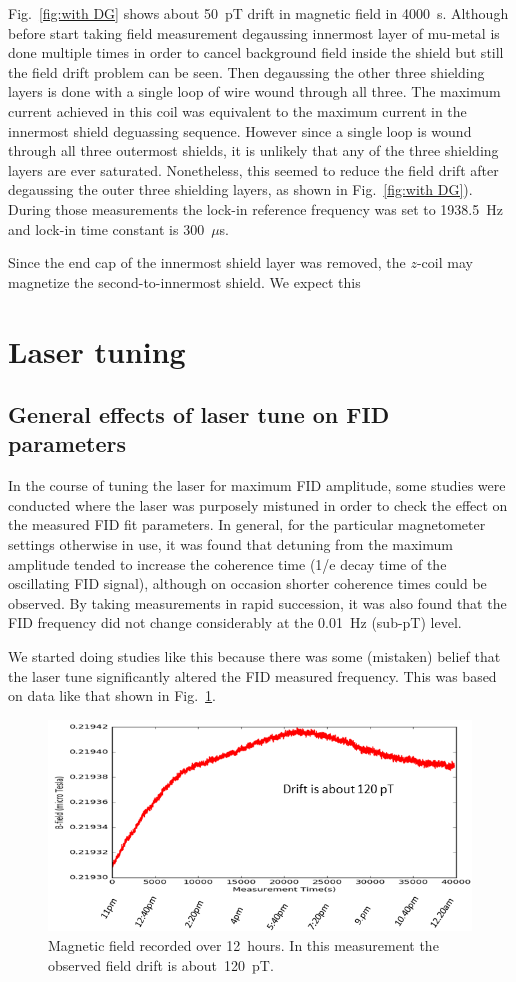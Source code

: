 Fig.~\ref{fig:with DG} shows about 50~pT drift in magnetic field in
4000~s. Although before start taking field measurement degaussing
innermost layer of mu-metal is done multiple times in order to cancel
background field inside the shield but still the field drift problem
can be seen. Then degaussing the other three shielding layers is done
with a single loop of wire wound through all three.  The maximum
current achieved in this coil was equivalent to the maximum current in
the innermost shield deguassing sequence.  However since a single loop
is wound through all three outermost shields, it is unlikely that any
of the three shielding layers are ever saturated.  Nonetheless, this
seemed to reduce the field drift after degaussing the outer three
shielding layers, as shown in Fig.~\ref{fig:with DG}). During those
measurements the lock-in reference frequency was set to 1938.5~Hz and
lock-in time constant is 300~$\mu$s.

Since the end cap of the innermost shield layer was removed, the
$z$-coil may magnetize the second-to-innermost shield.  We expect this 

\section{Laser tuning} 

\subsection{General effects of laser tune on FID parameters}

In the course of tuning the laser for maximum FID amplitude, some
studies were conducted where the laser was purposely mistuned in order
to check the effect on the measured FID fit parameters.  In general,
for the particular magnetometer settings otherwise in use, it was
found that detuning from the maximum amplitude tended to increase the
coherence time (1/e decay time of the oscillating FID signal),
although on occasion shorter coherence times could be observed.  By
taking measurements in rapid succession, it was also found that the
FID frequency did not change considerably at the 0.01~Hz (sub-pT)
level.

We started doing studies like this because there was some (mistaken)
belief that the laser tune significantly altered the FID measured
frequency.  This was based on data like that shown in
Fig.~\ref{fig:digilock-drift}.

\begin{figure}%
  \centering\includegraphics[width=0.6\linewidth]{figures/field_drift}
  \caption{Magnetic field recorded over 12~hours.  In this
    measurement the observed field drift is
    about~120~pT.\label{fig:digilock-drift}}
\end{figure}

